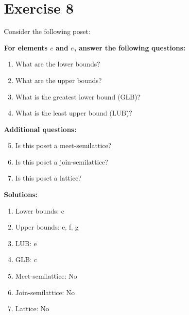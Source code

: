 \documentclass{article}
\begin{document}
\section*{Exercise 8}
Consider the following poset:
\begin{center}
\end{center}

    \textbf{For elements $c$ and $e$, answer the following questions:}
\begin{enumerate}
    \item What are the lower bounds?
    \item What are the upper bounds?
    \item What is the greatest lower bound (GLB)?
    \item What is the least upper bound (LUB)?
\end{enumerate}
    \hspace*{3ex} \textbf{Additional questions:}
\begin{enumerate}
    \setcounter{enumi}{4}
    \item Is this poset a meet-semilattice?
    \item Is this poset a join-semilattice?
    \item Is this poset a lattice?
\end{enumerate}

\textbf{Solutions:}
\begin{enumerate}
    \item Lower bounds: {c}
    \item Upper bounds: {e, f, g}
    \item LUB: e
    \item GLB: c
    \item Meet-semilattice: No
    \item Join-semilattice: No
    \item Lattice: No
\end{enumerate}
\newpage
\end{document}
